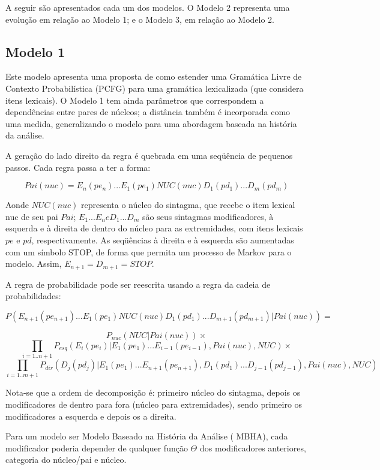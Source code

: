 A seguir são apresentados cada um dos modelos. O Modelo 2 representa uma
evolução em relação ao Modelo 1; e o Modelo 3, em relação ao Modelo 2.


\subsection{Modelo 1}
\label{sub:modelo1}


Este modelo apresenta uma proposta de como estender uma Gramática Livre de Contexto Probabilística (PCFG) para uma gramática lexicalizada (que considera itens lexicais). O Modelo 1 tem ainda parâmetros que correspondem a dependências entre pares de núcleos; a distância também é incorporada como uma medida, generalizando o modelo para uma abordagem baseada na história da análise.

A geração do lado direito da regra é quebrada em uma seqüência de pequenos passos. Cada regra passa a ter a forma:


$$Pai(nuc) = E_n(pe_n)...E_1(pe_1)NUC(nuc)D_1(pd_1)...D_m(pd_m)$$


Aonde $NUC(nuc)$ representa o núcleo do sintagma, que recebe o item lexical nuc de seu pai $Pai$; $E_1...E_n e D_1...D_m$ são seus sintagmas modificadores, à esquerda e à direita de dentro do núcleo para as extremidades, com itens lexicais $pe$ e $pd$, respectivamente. As seqüências à direita e à esquerda são aumentadas com um símbolo STOP, de forma que permita um processo de Markov para o modelo. Assim, $ E_{n+1} = D_{m+1} = STOP $.

A regra de probabilidade pode ser reescrita usando a regra da cadeia de probabilidades:

$$P(E_{n+1}(pe_{n+1})...E_1(pe_1)NUC(nuc)D_1(pd_1)...D_{m+1}(pd_{m+1})|Pai(nuc)) = $$

$$P_{nuc}(NUC|Pai(nuc)) \times $$
$$\prod_{i=1..n+1} P_{esq}(E_i(pe_i)|E_1(pe_1)...E_{i-1}(pe_{i-1}), Pai(nuc),NUC) \times $$
$$\prod_{i=1..m+1} P_{dir}(D_j(pd_j)|E_1(pe_1)...E_{n+1}(pe_{n+1}),D_1(pd_1)...D_{j-1}(pd_{j-1}), Pai(nuc),NUC)  $$

Nota-se que a ordem de decomposição é: primeiro núcleo do sintagma, depois os modificadores de dentro para fora (núcleo para extremidades), sendo primeiro os modificadores a esquerda e depois os a direita.

Para um modelo ser Modelo Baseado na História da Análise ( MBHA), cada modificador poderia depender de qualquer função $\Theta$ dos modificadores anteriores, categoria do núcleo/pai e núcleo.

